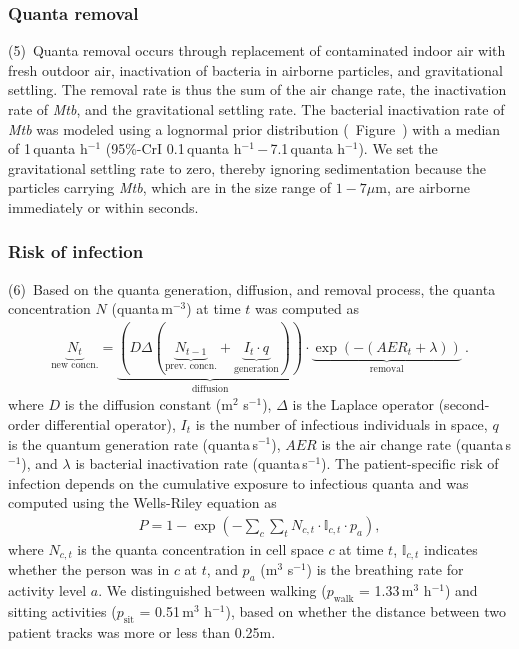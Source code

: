 \documentclass[fleqn,11pt]{wlscirep}
\begin{document}
\subsubsection*{Quanta removal}

(5)~Quanta removal occurs through replacement of contaminated indoor air with fresh outdoor air, inactivation of bacteria in airborne particles, and gravitational settling. The removal rate is thus the sum of the air change rate, the inactivation rate of \emph{Mtb}, and the gravitational settling rate. The bacterial inactivation rate of \emph{Mtb} was modeled using a lognormal prior distribution (\supp~Figure~) with a median of 1\,quanta h$^{-1}$ (95\%-CrI 0.1\,quanta h$^{-1}$\,$-$\,7.1\,quanta h$^{-1}$)\cite{Loudon1969AMRRD,Lever2000LettersAppliedMicrobio,Gannon2007ResVetSci,Klein2014IJMyco}. We set the gravitational settling rate to zero, thereby ignoring sedimentation because the particles carrying \emph{Mtb}, which are in the size range of $1-7\mu$m\cite{Fennelly2020Lancet}, are airborne immediately or within seconds\cite{Vuorinen2020SafSci}.

\subsubsection*{Risk of infection}

(6)~Based on the quanta generation, diffusion, and removal process, the quanta concentration $N$ (quanta\,m$^{-3}$) at time $t$ was computed as 
\begin{align}\label{eq:spattemp-N}
    \underbrace{N_{t}}_{\text{new concn.}} = \underbrace{\left(D \Delta (\underbrace{N_{t-1}}_{\text{prev. concn.}} + \underbrace{I_t \cdot q}_{\text{generation}})\right)}_{\text{diffusion}} \cdot \underbrace{\exp\left(-(AER_t + \lambda)\right)}_{\text{removal}} ~.
\end{align}
where $D$ is the diffusion constant (m$^2$ s$^{-1}$), $\Delta$ is the Laplace operator (second-order differential operator), $I_t$ is the number of infectious individuals in space, $q$ is the quantum generation rate (quanta\,s$^{-1}$), $AER$ is the air change rate (quanta\,s$^{-1}$), and $\lambda$ is bacterial inactivation rate (quanta\,s$^{-1}$). The patient-specific risk of infection depends on the cumulative exposure to infectious quanta and was computed using the Wells-Riley equation as
\begin{align}
    P = 1-\exp\left(-\sum_c \sum_t N_{c,t} \cdot \mathbb{I}_{c,t} \cdot p_a\right),
\end{align}
where $N_{c,t}$ is the quanta concentration in cell space $c$ at time $t$, $\mathbb{I}_{c,t}$ indicates whether the person was in $c$ at $t$, and $p_a$ (m$^3$ s$^{-1}$) is the breathing rate for activity level $a$. We distinguished between walking ($p_\mathrm{walk}$ = 1.33\,m$^3$ h$^{-1}$) and sitting activities ($p_\mathrm{sit}$ = 0.51\,m$^3$ h$^{-1}$)\cite{Adams1993}, based on whether the distance between two patient tracks was more or less than 0.25m.
\end{document}
